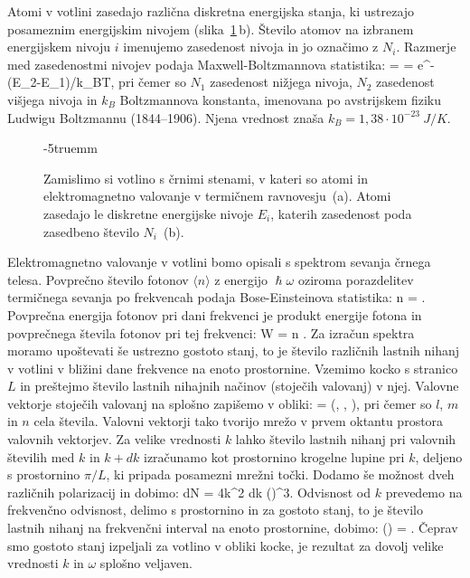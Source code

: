 Atomi v votlini zasedajo različna diskretna  energijska stanja,
ki ustrezajo posameznim energijskim nivojem 
(slika~\ref{fig:11_votlina}\,b). Število atomov na izbranem
energijskem nivoju $i$ imenujemo zasedenost nivoja in jo označimo z $N_i$.
Razmerje med zasedenostmi nivojev podaja
Maxwell-Boltzmannova statistika:
\beq
{} =  = e^{-(E_2-E_1)/k_BT},
\label{eq:11_01}
\eeq
pri čemer so $N_1$ zasedenost nižjega nivoja, $N_2$ zasedenost višjega 
nivoja in $k_B$ Boltzmannova konstanta, imenovana po avstrijskem
fiziku Ludwigu Boltzmannu (1844--1906). Njena vrednost znaša 
$k_B = 1,38 \cdot 10^{-23}~\si{J/K}$.
\begin{figure}[h!]
\centering
\def\svgwidth{80truemm} 

\caption{Zamislimo si votlino s črnimi stenami, v kateri so 
atomi in elektromagnetno valovanje v termičnem ravnovesju~(a). 
Atomi zasedajo le diskretne
energijske nivoje $E_i$, katerih zasedenost poda zasedbeno 
število $N_i$~(b). 
}
\label{fig:11_votlina}
\vglue-5truemm
\end{figure}

Elektromagnetno valovanje v votlini bomo opisali s spektrom sevanja
črnega telesa. Povprečno število fotonov $\langle n \rangle$ 
z energijo $\hslash \omega$ oziroma porazdelitev 
termičnega sevanja po frekvencah podaja 
Bose-Einsteinova statistika:
\beq
\langle n \rangle = .
\label{eq:11_02}
\eeq
Povprečna energija fotonov pri dani frekvenci je produkt energije fotona
in povprečnega števila fotonov pri tej frekvenci:
\beq
\langle W \rangle = \hslash \omega \langle n \rangle.
\label{eq:11_03}
\eeq
Za izračun spektra moramo upoštevati še ustrezno gostoto stanj, 
to je število različnih lastnih nihanj v votlini v bližini dane 
frekvence na enoto prostornine. Vzemimo kocko s stranico $L$ in 
preštejmo število lastnih nihajnih načinov (stoječih valovanj) v njej.
Valovne vektorje stoječih valovanj na splošno zapišemo v obliki:
\beq
{} = \left(, , \right)\!\!,
\label{eq:11_04}
\eeq
pri čemer so $l$, $m$ in $n$ cela števila. Valovni vektorji tako tvorijo 
mrežo v prvem oktantu prostora valovnih vektorjev.
Za velike vrednosti $k$ lahko število lastnih nihanj pri valovnih 
številih med $k$ in $k+dk$ izračunamo kot prostornino krogelne 
lupine pri $k$, deljeno s prostornino $\pi/L$, ki pripada posamezni 
mrežni točki. Dodamo še možnost dveh različnih polarizacij in dobimo:
\beq
dN = 4\pi k^2 dk \left(\right)^3\!\!.
\label{eq:11_05}
\eeq
Odvisnost od $k$ prevedemo na frekvenčno odvisnost, delimo s prostornino
in za gostoto stanj, to je število lastnih nihanj na frekvenčni interval
na enoto prostornine, dobimo:
\beq
\varrho (\omega) = .
\label{eq:11_06}
\eeq
Čeprav smo gostoto stanj izpeljali za votlino v obliki kocke, 
je rezultat za dovolj velike vrednosti $k$ in $\omega$ splošno veljaven. 

